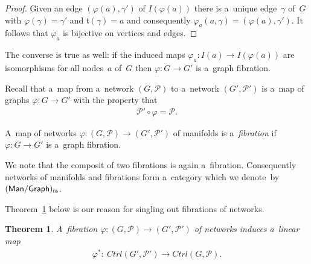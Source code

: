 \documentclass[10pt,a4paper]{amsart}
\numberwithin{equation}{section}
\newtheorem{Theorem}{Theorem}[section]
\renewcommand{\mathpzc}[1]{\mathit{#1}}
\begin{document}
\begin{proof}
Given an edge $(\varphi(a), \gamma')$ of $I(\varphi(a))$ there is a~unique edge~$\gamma$ of~$G$ with $\varphi(\gamma) =
\gamma'$ and $\mathfrak t(\gamma) = a$ and consequently $\varphi_a (a,\gamma) = (\varphi(a),\gamma')$.
It follows that $\varphi_a$ is bijective on vertices and edges.
\end{proof}
\begin{Remark}
The converse is true as well: if the induced maps $\varphi_a\colon I(a)\to I(\varphi(a))$ are isomorphisms for all
nodes~$a$ of~$G$ then $\varphi\colon G\to G'$ is a~graph f\/ibration.
\end{Remark}

Recall that a~map from a~network $(G,{\mathcal P})$ to a~network $(G',{\mathcal P}')$ is a~map of graphs $\varphi\colon
G\to G'$ with the property that
\begin{gather*}
{\mathcal P}'\circ \varphi = {\mathcal P}.
\end{gather*}

\begin{Definition}
A~map of networks $\varphi\colon (G,{\mathcal P}) \to (G',{\mathcal P}')$ of
manifolds is a~{\it fibration} if $\varphi\colon G\to G'$ is a~graph f\/ibration.
\end{Definition}
\begin{Remark} We note
that the composit of two f\/ibrations is again a~f\/ibration.
Consequently networks of manifolds and f\/ibrations form a~category which we denote~by
$(\mathsf{Man}/\mathsf{Graph})_{\mbox{\sf{\tiny{f\/ib}}}} $.
\end{Remark}
Theorem~\ref{thm:4.4} below is our reason for singling out f\/ibrations of networks.
\begin{Theorem}
\label{thm:4.4}
A~fibration $\varphi\colon (G,{\mathcal P})\to (G',{\mathcal P}')$ of networks induces a~linear map
\begin{gather*}
\varphi^*\colon \ \mathpzc{Ctrl}(G',{\mathcal P}')\to \mathpzc{Ctrl}(G,{\mathcal P}).
\end{gather*}
\end{Theorem}
\end{document}

